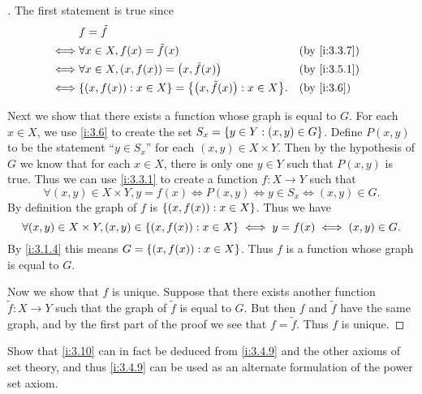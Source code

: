 \begin{proof}[]
  The first statement is true since
  \begin{align*}
         & f = \tilde{f}                                                                       \\
    \iff & \forall x \in X, f(x) = \tilde{f}(x)                              &  & \by{i:3.3.7} \\
    \iff & \forall x \in X, (x, f(x)) = \pa{x, \tilde{f}(x)}                 &  & \by{i:3.5.1} \\
    \iff & \set{(x, f(x)) : x \in X} = \set{\pa{x, \tilde{f}(x)} : x \in X}. &  & \by{i:3.6}
  \end{align*}

  Next we show that there exists a function whose graph is equal to \(G\).
  For each \(x \in X\), we use \cref{i:3.6} to create the set \(S_x = \left\lbrace y \in Y : (x, y) \in G\right\rbrace\).
  Define \(P(x, y)\) to be the statement ``\(y \in S_x\)'' for each \((x, y) \in X \times Y\).
  Then by the hypothesis of \(G\) we know that for each \(x \in X\), there is only one \(y \in Y\) such that \(P(x, y)\) is true.
  Thus we can use \cref{i:3.3.1} to create a function \(f : X \to Y\) such that
  \[
    \forall (x, y) \in X \times Y, y = f(x) \iff P(x, y) \iff y \in S_x \iff (x, y) \in G.
  \]
  By definition the graph of \(f\) is \(\left\lbrace(x, f(x)) : x \in X\right\rbrace\).
  Thus we have
  \[
    \forall (x, y) \in X \times Y, (x, y) \in \left\lbrace(x, f(x)) : x \in X\right\rbrace \iff y = f(x) \iff (x, y) \in G.
  \]
  By \cref{i:3.1.4} this means \(G = \left\lbrace(x, f(x)) : x \in X\right\rbrace\).
  Thus \(f\) is a function whose graph is equal to \(G\).

  Now we show that \(f\) is unique.
  Suppose that there exists another function \(\tilde{f} : X \to Y\) such that the graph of \(\tilde{f}\) is equal to \(G\).
  But then \(f\) and \(\tilde{f}\) have the same graph, and by the first part of the proof we see that \(f = \tilde{f}\).
  Thus \(f\) is unique.
\end{proof}

\begin{ex}\label{i:ex:3.5.11}
  Show that \cref{i:3.10} can in fact be deduced from \cref{i:3.4.9} and the other axioms of set theory, and thus \cref{i:3.4.9} can be used as an alternate formulation of the power set axiom.
\end{ex}

